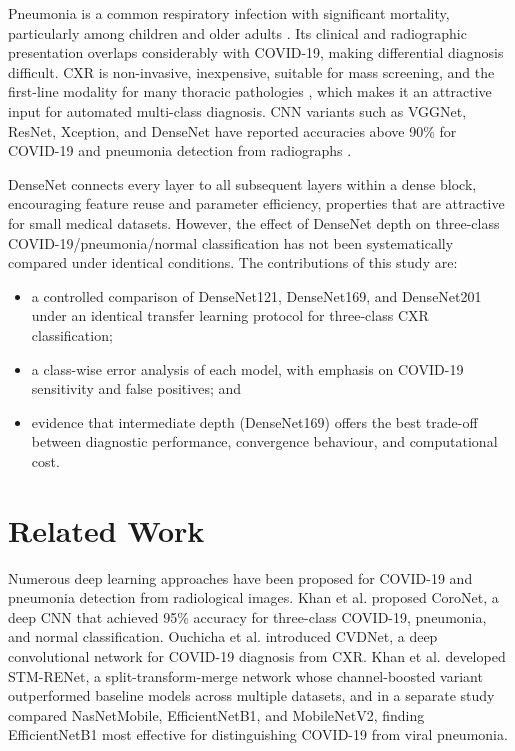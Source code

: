 \documentclass[pdflatex,sn-mathphys-num]{sn-jnl}%
\theoremstyle{thmstyleone}%
\theoremstyle{thmstyletwo}%
\theoremstyle{thmstylethree}%
\begin{document}
Pneumonia is a common respiratory infection with significant mortality, particularly among children and older adults \cite{Torres2021}. Its clinical and radiographic presentation overlaps considerably with COVID-19, making differential diagnosis difficult. CXR is non-invasive, inexpensive, suitable for mass screening, and the first-line modality for many thoracic pathologies \cite{Wang2017}, which makes it an attractive input for automated multi-class diagnosis. CNN variants such as VGGNet, ResNet, Xception, and DenseNet have reported accuracies above 90\% for COVID-19 and pneumonia detection from radiographs \cite{Khan2022b}.

DenseNet \cite{Huang2017} connects every layer to all subsequent layers within a dense block, encouraging feature reuse and parameter efficiency, properties that are attractive for small medical datasets. However, the effect of DenseNet depth on three-class COVID-19/pneumonia/normal classification has not been systematically compared under identical conditions. The contributions of this study are:
\begin{itemize}
\item a controlled comparison of DenseNet121, DenseNet169, and DenseNet201 under an identical transfer learning protocol for three-class CXR classification;
\item a class-wise error analysis of each model, with emphasis on COVID-19 sensitivity and false positives; and
\item evidence that intermediate depth (DenseNet169) offers the best trade-off between diagnostic performance, convergence behaviour, and computational cost.
\end{itemize}

\section{Related Work}
\label{sec:relwork}

Numerous deep learning approaches have been proposed for COVID-19 and pneumonia detection from radiological images. Khan et al. \cite{Khan2020} proposed CoroNet, a deep CNN that achieved 95\% accuracy for three-class COVID-19, pneumonia, and normal classification. Ouchicha et al. \cite{Ouchicha2021} introduced CVDNet, a deep convolutional network for COVID-19 diagnosis from CXR. Khan et al. \cite{Khan2022a} developed STM-RENet, a split-transform-merge network whose channel-boosted variant outperformed baseline models across multiple datasets, and in a separate study \cite{Khan2022b} compared NasNetMobile, EfficientNetB1, and MobileNetV2, finding EfficientNetB1 most effective for distinguishing COVID-19 from viral pneumonia.
\end{document}
